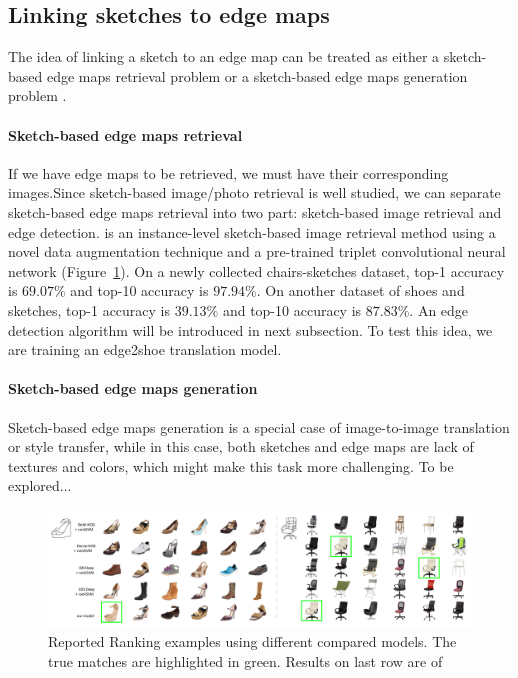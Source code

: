 \subsection{Linking sketches to edge maps}
The idea of linking a sketch to an edge map can be treated as either a sketch-based edge maps retrieval problem or a sketch-based edge maps generation problem .
\paragraph{Sketch-based edge maps retrieval}
If we have edge maps to be retrieved, we must have their corresponding images.Since sketch-based image/photo retrieval is well studied, we can separate sketch-based edge maps retrieval into two part: sketch-based image retrieval and edge detection. \cite{SketchMeThatShoe} is an instance-level sketch-based image retrieval method using a novel data augmentation technique and a pre-trained triplet convolutional neural network (Figure~\ref{reported_sketchmethatshoe}). On a newly collected chairs-sketches dataset, top-1 accuracy is $69.07\%$ and top-10 accuracy is $97.94\%$. On another dataset of shoes and sketches, top-1 accuracy is $39.13\%$ and top-10 accuracy is $87.83\%$. An edge detection algorithm will be introduced in next subsection. To test this idea, we are training an edge2shoe translation model.
\paragraph{Sketch-based edge maps generation}
Sketch-based edge maps generation is a special case of image-to-image translation or style transfer, while in this case, both sketches and edge maps are lack of textures and colors, which might make this task more challenging. 
To be explored...

\begin{figure}
	\includegraphics[width=\textwidth]{figures/pix2pix/reported_sketchmethatshoe}
	\caption{\label{reported_sketchmethatshoe}Reported Ranking examples using different compared models. The true matches are highlighted in green. Results on last row are of \cite{SketchMeThatShoe}}
\end{figure}

